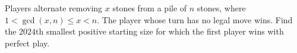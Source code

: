 Players alternate removing $x$ stones from a pile of $n$ stones, where $1<\gcd(x,n)\le x<n$. The player whose turn has no legal move wins. Find the $2024$th smallest positive starting size for which the first player wins with perfect play.
